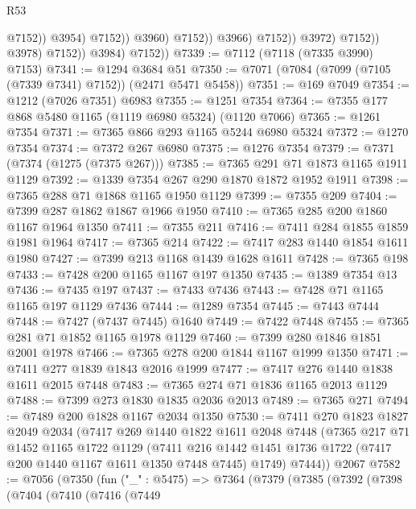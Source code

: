 \begin{lexlean}{R53}
\begin{coremodule}
                                            @7152))
                                        @3954)
                                      @7152))
                                  @3960)
                                @7152))
                            @3966)
                          @7152))
                      @3972)
                    @7152))
                @3978)
              @7152))
          @3984)
        @7152))
@7339 := @7112 (@7118 (@7335 @3990) @7153)
@7341 := @1294 @3684 @51
@7350 := @7071 (@7084 (@7099 (@7105 (@7339 @7341) @7152)) (@2471 @5471 @5458))
@7351 := @169 @7049
@7354 := @1212 (@7026 @7351) @6983
@7355 := @1251 @7354
@7364 := @7355 @177 @868 @5480 @1165 (@1119 @6980 @5324) (@1120 @7066)
@7365 := @1261 @7354
@7371 := @7365 @866 @293 @1165 @5244 @6980 @5324
@7372 := @1270 @7354
@7374 := @7372 @267 @6980
@7375 := @1276 @7354
@7379 := @7371 (@7374 (@1275 (@7375 @267)))
@7385 := @7365 @291 @71 @1873 @1165 @1911 @1129
@7392 := @1339 @7354 @267 @290 @1870 @1872 @1952 @1911
@7398 := @7365 @288 @71 @1868 @1165 @1950 @1129
@7399 := @7355 @209
@7404 := @7399 @287 @1862 @1867 @1966 @1950
@7410 := @7365 @285 @200 @1860 @1167 @1964 @1350
@7411 := @7355 @211
@7416 := @7411 @284 @1855 @1859 @1981 @1964
@7417 := @7365 @214
@7422 := @7417 @283 @1440 @1854 @1611 @1980
@7427 := @7399 @213 @1168 @1439 @1628 @1611
@7428 := @7365 @198
@7433 := @7428 @200 @1165 @1167 @197 @1350
@7435 := @1389 @7354 @13
@7436 := @7435 @197
@7437 := @7433 @7436
@7443 := @7428 @71 @1165 @1165 @197 @1129 @7436
@7444 := @1289 @7354
@7445 := @7443 @7444
@7448 := @7427 (@7437 @7445) @1640
@7449 := @7422 @7448
@7455 := @7365 @281 @71 @1852 @1165 @1978 @1129
@7460 := @7399 @280 @1846 @1851 @2001 @1978
@7466 := @7365 @278 @200 @1844 @1167 @1999 @1350
@7471 := @7411 @277 @1839 @1843 @2016 @1999
@7477 := @7417 @276 @1440 @1838 @1611 @2015 @7448
@7483 := @7365 @274 @71 @1836 @1165 @2013 @1129
@7488 := @7399 @273 @1830 @1835 @2036 @2013
@7489 := @7365 @271
@7494 := @7489 @200 @1828 @1167 @2034 @1350
@7530 := @7411
    @270
    @1823
    @1827
    @2049
    @2034
    (@7417
      @269
      @1440
      @1822
      @1611
      @2048
      @7448
      (@7365
        @217
        @71
        @1452
        @1165
        @1722
        @1129
        (@7411 @216 @1442 @1451 @1736 @1722 (@7417 @200 @1440 @1167 @1611 @1350 @7448 @7445) @1749)
        @7444))
    @2067
@7582 := @7056
    (@7350
      (fun ("_" : @5475) =>
      @7364
        (@7379
          (@7385
            (@7392
              (@7398
                (@7404
                  (@7410
                    (@7416
                      (@7449

\end{coremodule}
\end{lexlean}
